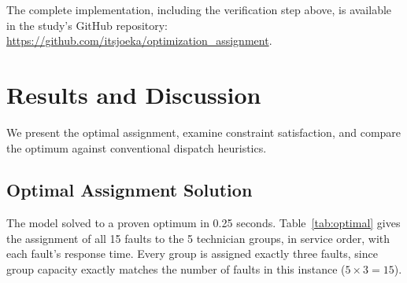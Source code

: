 \documentclass[11pt]{article}
\begin{document}
The complete implementation, including the verification step above, is available in the study's GitHub repository: \url{https://github.com/itsjoeka/optimization_assignment}.

\section*{Results and Discussion}

We present the optimal assignment, examine constraint satisfaction, and compare the optimum against conventional dispatch heuristics.

\subsection*{Optimal Assignment Solution}

The model solved to a proven optimum in 0.25 seconds. Table~\ref{tab:optimal} gives the assignment of all 15 faults to the 5 technician groups, in service order, with each fault's response time. Every group is assigned exactly three faults, since group capacity exactly matches the number of faults in this instance ($5 \times 3 = 15$).
\end{document}
